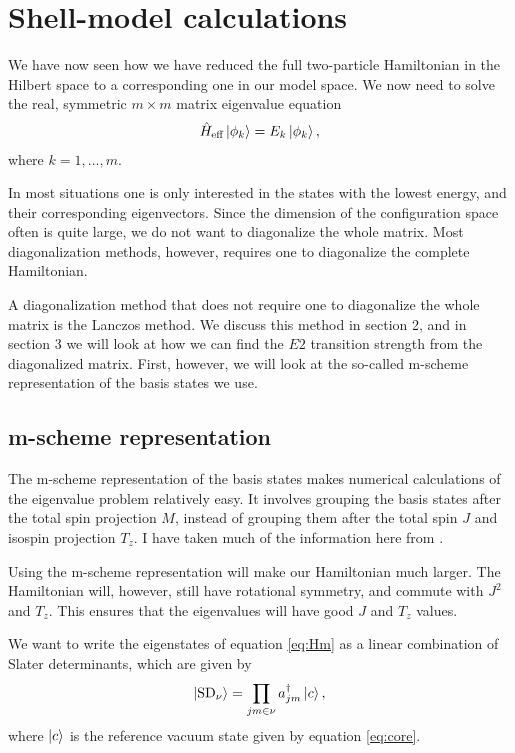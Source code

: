 \newcommand{\br}{\mathbf r}
\newcommand{\bA}{\mathbf A}
\newcommand{\bj}{\mathbf j}
\renewcommand{\t}[1]{\textrm{#1}}
\chapter{Shell-model calculations}

We have now seen how we have reduced the full two-particle Hamiltonian in the
Hilbert space to a corresponding one in our model space. We now need to solve
the real, symmetric $m\times m$ matrix eigenvalue equation
\begin{align}
	\he\ket{\phi_k} = E_k\ket{\phi_k},
	\label{eq:Hm}
\end{align}
where $k = 1,\dots,m$.

In most situations one is only interested in the states with the lowest energy,
and their corresponding eigenvectors. Since the dimension of the configuration
space often is quite large, we do not want to diagonalize the whole matrix.
Most diagonalization methods, however, requires one to diagonalize the complete
Hamiltonian.

A diagonalization method that does not require one to diagonalize the whole
matrix is the Lanczos method. We discuss this method in section 2, and in
section 3 we will look at how we can find the $E2$ transition strength from the
diagonalized matrix. First, however, we will look at the so-called m-scheme
representation of the basis states we use.

\section{m-scheme representation}

The m-scheme representation of the basis states makes numerical calculations of
the eigenvalue problem relatively easy. It involves grouping the basis states
after the total spin projection $M$, instead of grouping them after the total
spin $J$ and isospin projection $T_z$. I have taken much of the information
here from \citep{HBmaster}.

Using the m-scheme representation will make our Hamiltonian much larger. The Hamiltonian will,
however, still have rotational symmetry, and commute with $J^2$ and $T_z$. This
ensures that the eigenvalues will have good $J$ and $T_z$ values.

We want to write the eigenstates of equation \ref{eq:Hm} as a linear
combination of Slater determinants, which are given by
\begin{align}
	\ket{\textrm{SD}_\nu} = \prod_{jm\in\nu}a_{jm}^\dagger\ket c,
	\label{SD}
\end{align}
where $\left| c \right\rangle$ is the reference vacuum state given by equation \ref{eq:core}.

